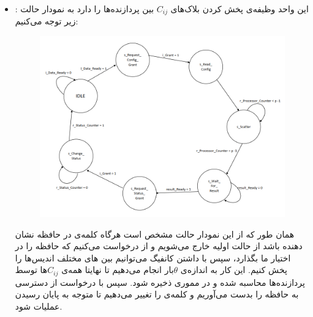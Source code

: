 \documentclass[12pt,onecolumn,a4paper,fleqn]{article}
\begin{document}
\begin{itemize}
	\item 
	:
	این واحد وظیفه‌ی پخش کردن بلاک‌های $C_{ij}$ بین پردازنده‌ها را دارد به نمودار حالت زیر توجه می‌کنیم:
	
	\begin{figure}[h]
		\centering
		\includegraphics[width=0.4\linewidth]{source/main_cu_fsm.png}
		\caption{}
	\end{figure}
	
	همان طور که از این نمودار حالت مشخص است هرگاه کلمه‌ی  در حافظه نشان‌ دهنده  باشد از حالت اولیه‌ خارج می‌شویم و از  درخواست می‌کنیم که حافظه‌ را در اختیار ما بگذارد، سپس با داشتن کانفیگ می‌توانیم بین ‌‌های مختلف اندیس‌ها را پخش کنیم. این کار به اندازه‌ی $\theta$بار انجام می‌دهیم تا نهایتا همه‌ی $C_{ij}$‌ها توسط پردازنده‌ها محاسبه شده و در مموری ذخیره شود. سپس با درخواست از  دسترسی به حافظه را بدست می‌آوریم و کلمه‌ی  را تغییر می‌دهیم تا  متوجه به پایان رسیدن عملیات شود.
	

\end{itemize}
\end{document}
